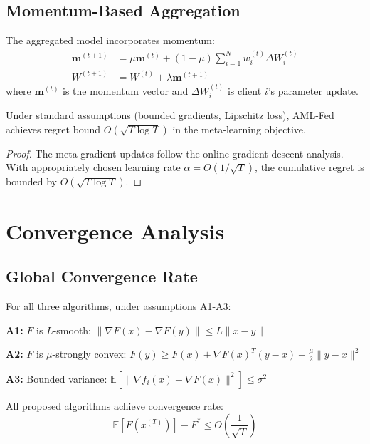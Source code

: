 \documentclass[12pt,a4paper]{article}
\begin{document}
\subsection{Momentum-Based Aggregation}

The aggregated model incorporates momentum:
\begin{align}
\mathbf{m}^{(t+1)} &= \mu \mathbf{m}^{(t)} + (1-\mu) \sum_{i=1}^N w_i^{(t)} \Delta W_i^{(t)} \\
W^{(t+1)} &= W^{(t)} + \lambda \mathbf{m}^{(t+1)}
\end{align}
where $\mathbf{m}^{(t)}$ is the momentum vector and $\Delta W_i^{(t)}$ is client $i$'s parameter update.

\begin{theorem}
Under standard assumptions (bounded gradients, Lipschitz loss), AML-Fed achieves regret bound $O(\sqrt{T \log T})$ in the meta-learning objective.
\end{theorem}

\begin{proof}
The meta-gradient updates follow the online gradient descent analysis. With appropriately chosen learning rate $\alpha = O(1/\sqrt{T})$, the cumulative regret is bounded by $O(\sqrt{T \log T})$.
\end{proof}

\section{Convergence Analysis}

\subsection{Global Convergence Rate}

For all three algorithms, under assumptions A1-A3:

\textbf{A1:} $F$ is $L$-smooth: $\|\nabla F(x) - \nabla F(y)\| \leq L\|x - y\|$

\textbf{A2:} $F$ is $\mu$-strongly convex: $F(y) \geq F(x) + \nabla F(x)^T(y-x) + \frac{\mu}{2}\|y-x\|^2$

\textbf{A3:} Bounded variance: $\mathbb{E}[\|\nabla f_i(x) - \nabla F(x)\|^2] \leq \sigma^2$

\begin{theorem}
All proposed algorithms achieve convergence rate:
\begin{equation}
\mathbb{E}[F(x^{(T)})] - F^* \leq O\left(\frac{1}{\sqrt{T}}\right)
\end{equation}
\end{theorem}
\end{document}
